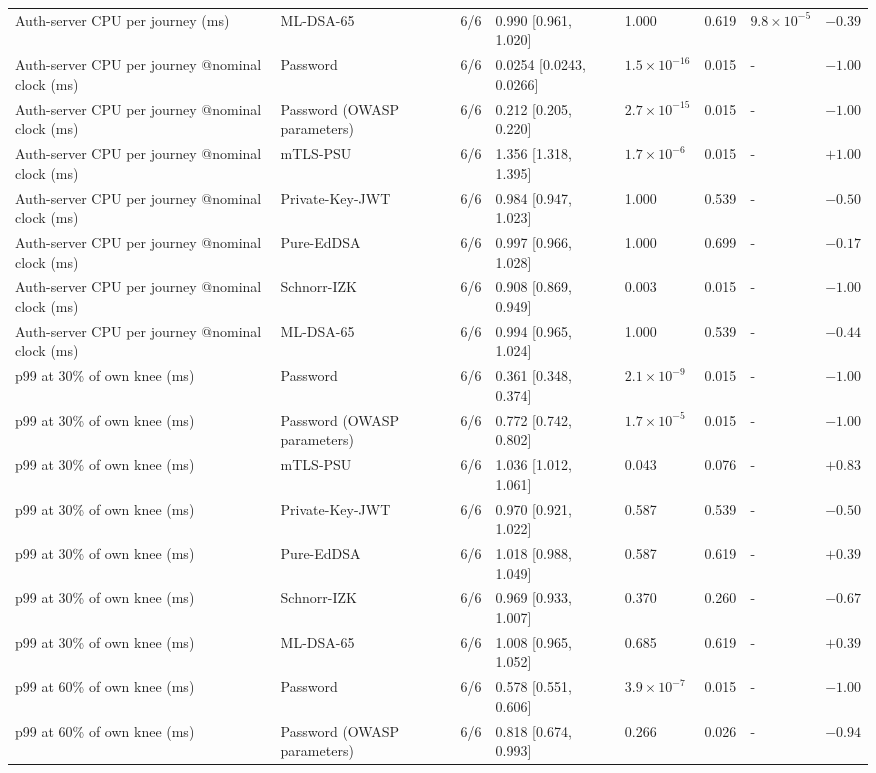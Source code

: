 \begin{tabular}{@{}llrlllll@{}}
Auth-server CPU per journey (ms) & ML-DSA-65 & 6/6 & 0.990 [0.961, 1.020] & 1.000 & 0.619 & $9.8\times10^{-5}$ & $-0.39$ \\
Auth-server CPU per journey @nominal clock (ms) & Password & 6/6 & 0.0254 [0.0243, 0.0266] & $1.5\times10^{-16}$ & 0.015 & - & $-1.00$ \\
Auth-server CPU per journey @nominal clock (ms) & Password (OWASP parameters) & 6/6 & 0.212 [0.205, 0.220] & $2.7\times10^{-15}$ & 0.015 & - & $-1.00$ \\
Auth-server CPU per journey @nominal clock (ms) & mTLS-PSU & 6/6 & 1.356 [1.318, 1.395] & $1.7\times10^{-6}$ & 0.015 & - & $+1.00$ \\
Auth-server CPU per journey @nominal clock (ms) & Private-Key-JWT & 6/6 & 0.984 [0.947, 1.023] & 1.000 & 0.539 & - & $-0.50$ \\
Auth-server CPU per journey @nominal clock (ms) & Pure-EdDSA & 6/6 & 0.997 [0.966, 1.028] & 1.000 & 0.699 & - & $-0.17$ \\
Auth-server CPU per journey @nominal clock (ms) & Schnorr-IZK & 6/6 & 0.908 [0.869, 0.949] & 0.003 & 0.015 & - & $-1.00$ \\
Auth-server CPU per journey @nominal clock (ms) & ML-DSA-65 & 6/6 & 0.994 [0.965, 1.024] & 1.000 & 0.539 & - & $-0.44$ \\
p99 at 30\% of own knee (ms) & Password & 6/6 & 0.361 [0.348, 0.374] & $2.1\times10^{-9}$ & 0.015 & - & $-1.00$ \\
p99 at 30\% of own knee (ms) & Password (OWASP parameters) & 6/6 & 0.772 [0.742, 0.802] & $1.7\times10^{-5}$ & 0.015 & - & $-1.00$ \\
p99 at 30\% of own knee (ms) & mTLS-PSU & 6/6 & 1.036 [1.012, 1.061] & 0.043 & 0.076 & - & $+0.83$ \\
p99 at 30\% of own knee (ms) & Private-Key-JWT & 6/6 & 0.970 [0.921, 1.022] & 0.587 & 0.539 & - & $-0.50$ \\
p99 at 30\% of own knee (ms) & Pure-EdDSA & 6/6 & 1.018 [0.988, 1.049] & 0.587 & 0.619 & - & $+0.39$ \\
p99 at 30\% of own knee (ms) & Schnorr-IZK & 6/6 & 0.969 [0.933, 1.007] & 0.370 & 0.260 & - & $-0.67$ \\
p99 at 30\% of own knee (ms) & ML-DSA-65 & 6/6 & 1.008 [0.965, 1.052] & 0.685 & 0.619 & - & $+0.39$ \\
p99 at 60\% of own knee (ms) & Password & 6/6 & 0.578 [0.551, 0.606] & $3.9\times10^{-7}$ & 0.015 & - & $-1.00$ \\
p99 at 60\% of own knee (ms) & Password (OWASP parameters) & 6/6 & 0.818 [0.674, 0.993] & 0.266 & 0.026 & - & $-0.94$ \\

\end{tabular}
